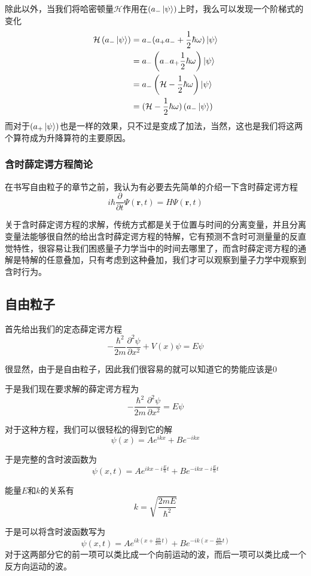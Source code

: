 \documentclass{article}
\begin{document}
除此以外，当我们将哈密顿量$\mathcal{H}$作用在$(a_{-}\ket{\psi})$上时，我么可以发现一个阶梯式的变化
\begin{align*}
    \mathcal{H}\left(a_{-}\ket{\psi}\right)&=a_{-}(a_{+}a_{-}+\frac{1}{2}\hbar\omega)\ket{\psi}\\
    &=a_{-}\left(a_{-}a_{+}\frac{1}{2}\hbar\omega\right)\ket{\psi}\\
    &=a_{-}\left(\mathcal{H}-\frac{1}{2}\hbar\omega\right)\ket{\psi}\\
    &=(\mathcal{H}-\frac{1}{2}\hbar\omega)\left(a_{-}\ket{\psi}\right)
\end{align*}
而对于$(a_{+}\ket{\psi})$也是一样的效果，只不过是变成了加法，当然，这也是我们将这两个算符成为升降算符的主要原因。



\subsubsection{含时薛定谔方程简论}
在书写自由粒子的章节之前，我认为有必要去先简单的介绍一下含时薛定谔方程
\[
    i\hbar\frac{\partial}{\partial t}\Psi(\textbf{r},t)=H\Psi(\textbf{r},t)
\]

关于含时薛定谔方程的求解，传统方式都是关于位置与时间的分离变量，并且分离变量法能够很自然的给出含时薛定谔方程的特解，它有预测不含时可测量量的反直觉特性，很容易让我们困惑量子力学当中的时间去哪里了，而含时薛定谔方程的通解是特解的任意叠加，只有考虑到这种叠加，我们才可以观察到量子力学中观察到含时行为。




\subsection{自由粒子}
首先给出我们的定态薛定谔方程
\[
    -\frac{\hbar^2}{2m}\frac{\partial^2\psi}{\partial x^2}+V(x)\psi=E\psi
\]

很显然，由于是自由粒子，因此我们很容易的就可以知道它的势能应该是$0$

于是我们现在要求解的薛定谔方程为
\[
    -\frac{\hbar^2}{2m}\frac{\partial^2\psi}{\partial x^2}=E\psi
\]

对于这种方程，我们可以很轻松的得到它的解 
\[\psi(x)=Ae^{ikx}+Be^{-ikx}\]

于是完整的含时波函数为
\[\psi(x,t)=Ae^{ikx-i\frac{E}{\hbar} t}+Be^{-ikx-i\frac{E}{\hbar} t}\]

能量$E$和$k$的关系有
\[
    k=\sqrt{\frac{2mE}{\hbar^2}}
\]

于是可以将含时波函数写为
\[
    \psi(x,t)=Ae^{ik(x+\frac{k\hbar}{2m}t)}+Be^{-ik(x-\frac{k\hbar}{2m}t)}
\]
对于这两部分它的前一项可以类比成一个向前运动的波，而后一项可以类比成一个反方向运动的波。
\end{document}
